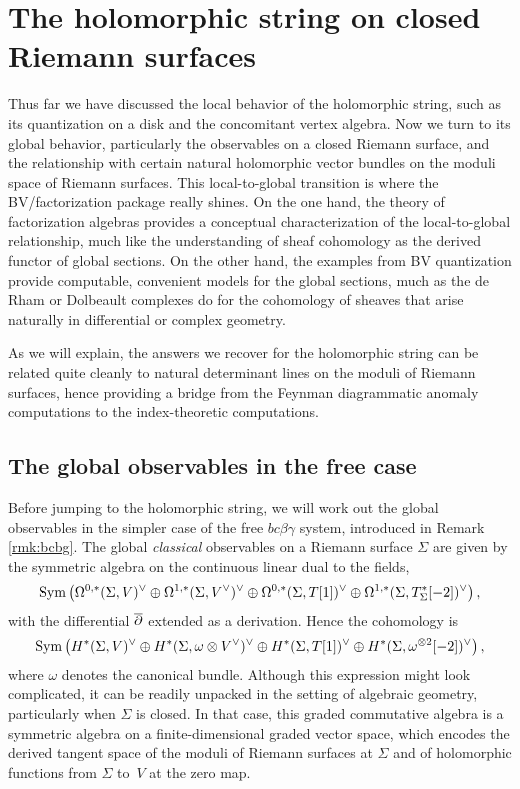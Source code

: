 \section{The holomorphic string on closed Riemann surfaces} 
\label{sec: conformalblock}

Thus far we have discussed the local behavior of the holomorphic string,
such as its quantization on a disk and the concomitant vertex algebra.
Now we turn to its global behavior, 
particularly the observables on a closed Riemann surface,
and the relationship with certain natural holomorphic vector bundles on the moduli space of Riemann surfaces.
This local-to-global transition is where the BV/factorization package really shines.
On the one hand, the theory of factorization algebras provides a conceptual characterization of the local-to-global relationship,
much like the understanding of sheaf cohomology as the derived functor of global sections.
On the other hand, the examples from BV quantization provide computable, convenient models for the global sections,
much as the de Rham or Dolbeault complexes do for the cohomology of sheaves that arise naturally in differential or complex geometry.

As we will explain, the answers we recover for the holomorphic string can be related quite cleanly to natural determinant lines on the moduli of Riemann surfaces,
hence providing a bridge from the Feynman diagrammatic anomaly computations to the index-theoretic computations.

\subsection{The global observables in the free case}

Before jumping to the holomorphic string, 
we will work out the global observables in the simpler case of the free $bc\beta\gamma$ system,
introduced in Remark \ref{rmk:bcbg}. 
The global {\it classical}\/ observables on a Riemann surface $\Sigma$ are given by the symmetric algebra on the continuous linear dual to the fields,
\[
{\rm Sym}\left(\Omega^{0,*}(\Sigma,V)^\vee \oplus \Omega^{1,*}(\Sigma,V^\vee)^\vee \oplus \Omega^{0,*}(\Sigma,T[1])^\vee \oplus \Omega^{1,*}(\Sigma,T^*_\Sigma[-2])^\vee \right),
\]
with the differential $\overline{\partial}$ extended as a derivation.
Hence the cohomology is
\[
{\rm Sym}\left(H^*(\Sigma,V)^\vee \oplus H^*(\Sigma,\omega \otimes V^\vee)^\vee \oplus H^*(\Sigma,T[1])^\vee \oplus H^*(\Sigma,\omega^{\otimes 2}[-2])^\vee\right),
\]
where $\omega$ denotes the canonical bundle.
Although this expression might look complicated, 
it can be readily unpacked in the setting of algebraic geometry, 
particularly when $\Sigma$ is closed.
In that case, this graded commutative algebra is a symmetric algebra on a finite-dimensional graded vector space,
which encodes the derived tangent space of the moduli of Riemann surfaces at $\Sigma$ and of holomorphic functions from $\Sigma$ to~$V$ at the zero map. 

